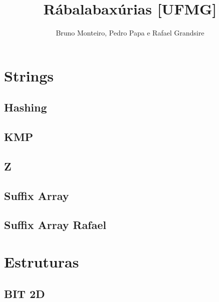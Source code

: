 \documentclass[12pt, a4paper, twoside]{article}
\title{Rábalabaxúrias [UFMG]}
\author{Bruno Monteiro, Pedro Papa e Rafael Grandsire}
\begin{document}
\twocolumn
\date{} %
\maketitle


\renewcommand{\contentsname}{Índice} %
\tableofcontents




%
%

\section{Strings}

\subsection{Hashing}


\subsection{KMP}


\subsection{Z}


\subsection{Suffix Array}


\subsection{Suffix Array Rafael}




%
%

\section{Estruturas}

\subsection{BIT 2D}

\end{document}
